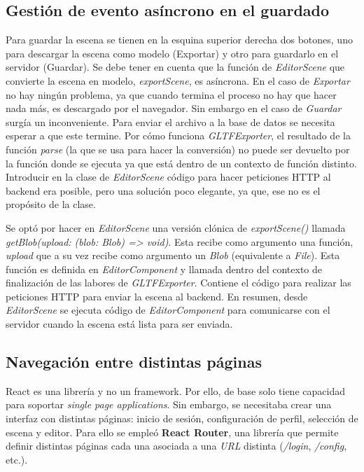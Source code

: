 \subsection{Gestión de evento asíncrono en el guardado}

Para guardar la escena se tienen en la esquina superior derecha dos botones, uno para descargar la escena como modelo (Exportar) y otro para guardarlo en el servidor (Guardar). Se debe tener en cuenta que la función de \textit{EditorScene} que convierte la escena en modelo, \textit{exportScene}, es asíncrona. En el caso de \textit{Exportar} no hay ningún problema, ya que cuando termina el proceso no hay que hacer nada más, es descargado por el navegador. Sin embargo en el caso de \textit{Guardar} surgía un inconveniente. Para enviar el archivo a la base de datos se necesita esperar a que este termine. Por cómo funciona \textit{GLTFExporter}, el resultado de la función \textit{parse} (la que se usa para hacer la conversión) no puede ser devuelto por la función donde se ejecuta ya que está dentro de un contexto de función distinto. Introducir en la clase de \textit{EditorScene} código para hacer peticiones HTTP al backend era posible, pero una solución poco elegante, ya que, ese no es el propósito de la clase.

Se optó por hacer en \textit{EditorScene} una versión clónica de \textit{exportScene()} llamada \textit{getBlob(upload: (blob: Blob) => void)}. Esta recibe como argumento una función, \textit{upload} que a su vez recibe como argumento un \textit{Blob} (equivalente a \textit{File}). Esta función es definida en \textit{EditorComponent} y llamada dentro del contexto de finalización de las labores de \textit{GLTFExporter}. Contiene el código para realizar las peticiones HTTP para enviar la escena al backend. En resumen, desde \textit{EditorScene} se ejecuta código de \textit{EditorComponent} para comunicarse con el servidor cuando la escena está lista para ser enviada.

\subsection{Navegación entre distintas páginas}

React es una librería y no un framework. Por ello, de base solo tiene capacidad para soportar \textit{single page applications}. Sin embargo, se necesitaba crear una interfaz con distintas páginas: inicio de sesión, configuración de perfil, selección de escena y editor. Para ello se empleó \textbf{React Router}\cite{reactrouter}, una librería que permite definir distintas páginas cada una asociada a una \textit{URL} distinta (\textit{/login}, \textit{/config}, etc.).

